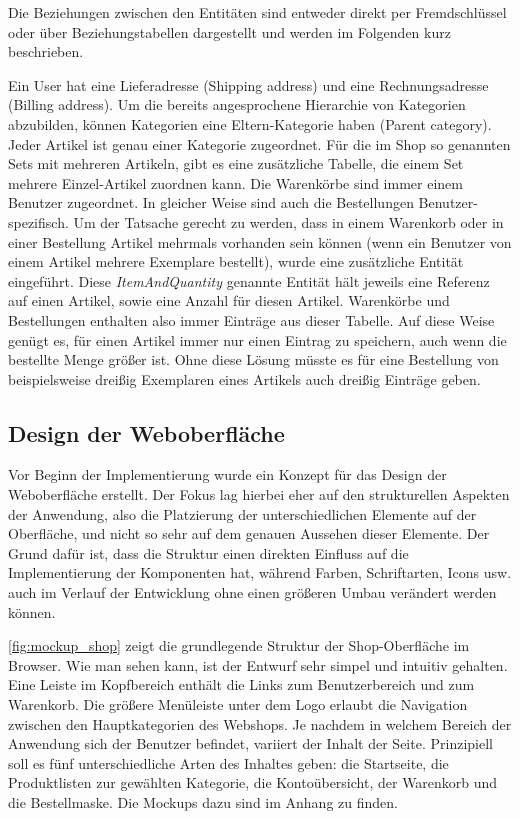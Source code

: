 Die Beziehungen zwischen den Entitäten sind entweder direkt per Fremdschlüssel oder über Beziehungstabellen dargestellt und werden im Folgenden kurz beschrieben.

Ein User hat eine Lieferadresse (Shipping address) und eine Rechnungsadresse (Billing address).
Um die bereits angesprochene Hierarchie von Kategorien abzubilden, können Kategorien eine Eltern-Kategorie haben (Parent category).
Jeder Artikel ist genau einer Kategorie zugeordnet. Für die im Shop so genannten Sets mit mehreren Artikeln, gibt es eine zusätzliche Tabelle, die einem Set mehrere Einzel-Artikel zuordnen kann.
Die Warenkörbe sind immer einem Benutzer zugeordnet. In gleicher Weise sind auch die Bestellungen Benutzer-spezifisch.
Um der Tatsache gerecht zu werden, dass in einem Warenkorb oder in einer Bestellung Artikel mehrmals vorhanden sein können (wenn ein Benutzer von einem Artikel mehrere Exemplare bestellt), wurde eine zusätzliche Entität eingeführt.
Diese \textit{ItemAndQuantity} genannte Entität hält jeweils eine Referenz auf einen Artikel, sowie eine Anzahl für diesen Artikel.
Warenkörbe und Bestellungen enthalten also immer Einträge aus dieser Tabelle.
Auf diese Weise genügt es, für einen Artikel immer nur einen Eintrag zu speichern, auch wenn die bestellte Menge größer ist.
Ohne diese Lösung müsste es für eine Bestellung von beispielsweise dreißig Exemplaren eines Artikels auch dreißig Einträge geben.

\subsection{Design der Weboberfläche}
Vor Beginn der Implementierung wurde ein Konzept für das Design der Weboberfläche erstellt.
Der Fokus lag hierbei eher auf den strukturellen Aspekten der Anwendung, also die Platzierung der unterschiedlichen Elemente auf der Oberfläche, und nicht so sehr auf dem genauen Aussehen dieser Elemente.
Der Grund dafür ist, dass die Struktur einen direkten Einfluss auf die Implementierung der Komponenten hat, während Farben, Schriftarten, Icons usw. auch im Verlauf der Entwicklung ohne einen größeren Umbau verändert werden können.

\cref{fig:mockup_shop} zeigt die grundlegende Struktur der Shop-Oberfläche im Browser.
Wie man sehen kann, ist der Entwurf sehr simpel und intuitiv gehalten. Eine Leiste im Kopfbereich enthält die Links zum Benutzerbereich und zum Warenkorb.
Die größere Menüleiste unter dem Logo erlaubt die Navigation zwischen den Hauptkategorien des Webshops.
Je nachdem in welchem Bereich der Anwendung sich der Benutzer befindet, variiert der Inhalt der Seite.
Prinzipiell soll es fünf unterschiedliche Arten des Inhaltes geben: die Startseite, die Produktlisten zur gewählten Kategorie, die Kontoübersicht, der Warenkorb und die Bestellmaske.
Die Mockups dazu sind im Anhang zu finden. %

